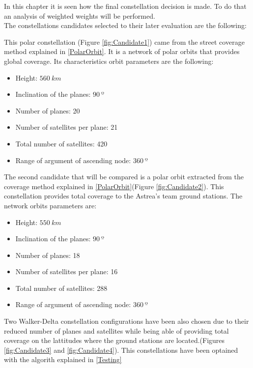In this chapter it is seen how the final constellation decision is made. To do that an analysis of weighted weights will be performed.\\

The constellations candidates selected to their later evaluation are the following:


This polar constellation (Figure \ref{fig:Candidate1}) came from the street coverage method explained in \ref{PolarOrbit}. It is a network of polar orbits that provides global coverage. Its characteristics orbit parameters are the following:

\begin{itemize}
\item Height: $560~{km}$ 
\item Inclination of the planes: $90~{º}$  
\item Number of planes: 20
\item Number of satellites per plane: 21
\item Total number of satellites: 420
\item Range of argument of ascending node: $360~{º}$ 
\end{itemize}


 
The second candidate that will be compared is a polar orbit extracted from the coverage method explained in \ref{PolarOrbit}(Figure \ref{fig:Candidate2}). This constellation provides total coverage to the Astrea's team ground stations. The network orbits parameters are:

\begin{itemize}
\item Height: $550~{km}$ 
\item Inclination of the planes: $90~{º}$  
\item Number of planes: 18
\item Number of satellites per plane: 16
\item Total number of satellites: 288
\item Range of argument of ascending node: $360~{º}$ 
\end{itemize}



Two Walker-Delta constellation configurations have been also chosen due to their reduced number of planes and satellites while being able of providing total coverage on the lattitudes where the ground stations are located.(Figures \ref{fig:Candidate3} and \ref{fig:Candidate4}).
This constellations have been optained with the algorith explained in \ref{Testing}

